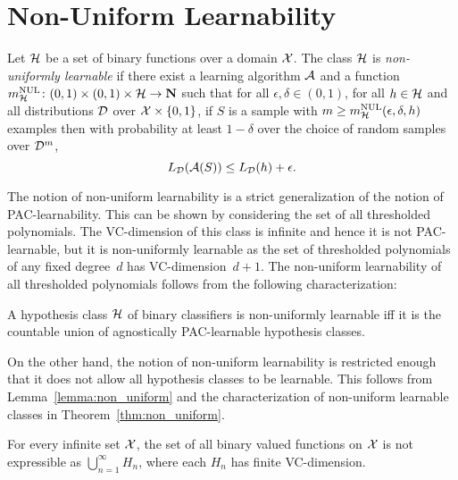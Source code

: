 \chapter{Non-Uniform Learnability}

Let $\mathcal{H}$ be a set of binary functions over a domain $\mathcal{X}$.  The class
$\mathcal{H}$ is \emph{non-uniformly learnable} if there exist a learning
algorithm $\mathcal{A}$ and a function $m_{\mathcal{H}}^{\text{NUL}} \colon (0, 1) \times (0, 1)
\times \mathcal{H} \rightarrow \mathbf{N}$ such that for all $\epsilon, \delta \in (0,
1)$, for all $h \in \mathcal{H}$ and all distributions $\mathcal{D}$ over 
$\mathcal{X} \times \{0, 1\}$, if $S$ is a sample with $m \geq m_{\mathcal{H}}^{\text{NUL}}(\epsilon,
\delta, h)$ examples then with probability at least $1 - \delta$ over the choice of
random samples over $\mathcal{D}^m$, 
\[
    L_{\mathcal{D}}(\mathcal{A} (S)) \leq L_{\mathcal{D}} (h) + \epsilon.
\]

The notion of non-uniform learnability is a strict generalization of the notion of 
PAC-learnability. This can be shown by considering the set of all thresholded 
polynomials. The VC-dimension of this class is infinite and hence it is not PAC-learnable, but 
it is non-uniformly learnable as the set of thresholded polynomials of any fixed degree~$d$ 
has VC-dimension~$d + 1$. The non-uniform learnability of all thresholded polynomials 
follows from the following characterization:

\begin{theorem} \label{thm:non_uniform}
A hypothesis class $\mathcal{H}$ of binary classifiers is non-uniformly learnable iff it 
is the countable union of agnostically PAC-learnable hypothesis classes.
\end{theorem}

On the other hand, the notion of non-uniform learnability is restricted enough
that it does not allow all hypothesis classes to be learnable. This follows
from Lemma~\ref{lemma:non_uniform} and the characterization of non-uniform
learnable classes in Theorem~\ref{thm:non_uniform}. 

\begin{lemma}\label{lemma:non_uniform}
For every infinite set $\mathcal{X}$, the set of all binary valued functions on $\mathcal{X}$ is
not expressible as $\bigcup_{n = 1}^{\infty} H_n$, where each $H_n$ has finite VC-dimension.
\end{lemma}

